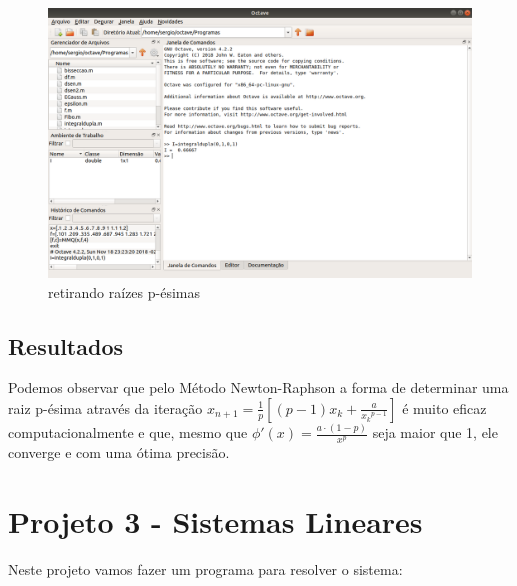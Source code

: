 \documentclass[11pt, openright, a4paper, brazil, openany, oneside]{abntex2}
\begin{document}
\begin{figure}[h]

    \center

    \includegraphics[width=12cm]{octave2.png}
    \caption{retirando raízes p-ésimas \label{octave2}}
    
\end{figure}

\section{Resultados}

Podemos observar que pelo Método Newton-Raphson a forma de determinar uma raiz p-ésima através da iteração $ x_{n+1} = \frac {1}{p} \left[( p-1)x_k + \frac{a}{{x_k}^{p-1}} \right] $ é muito eficaz computacionalmente e que, mesmo que $ \phi ' (x) = \frac {a \cdot (1-p)}{x^p}$ seja maior que 1, ele converge e com uma ótima precisão.

\newpage

\chapter{Projeto 3 - Sistemas Lineares}

Neste projeto vamos fazer um programa para resolver o sistema:
\end{document}
